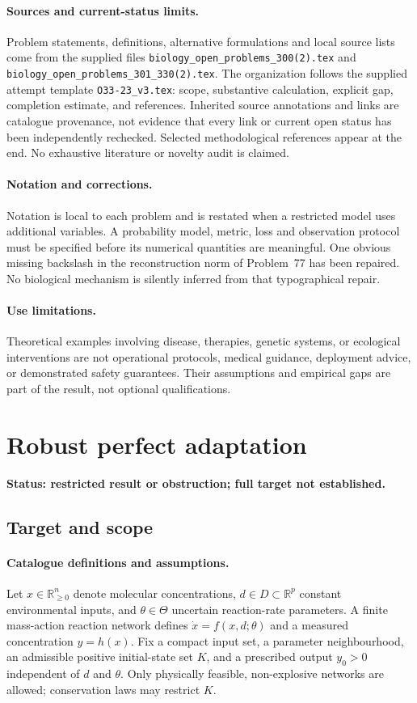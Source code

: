 \documentclass[11pt]{article}
\begin{document}
\paragraph{Sources and current-status limits.}
Problem statements, definitions, alternative formulations and local source lists
come from the supplied files
\texttt{biology\_open\_problems\_300(2).tex} and
\texttt{biology\_open\_problems\_301\_330(2).tex}.
The organization follows the supplied attempt template
\texttt{O33-23\_v3.tex}: scope, substantive calculation, explicit gap,
completion estimate, and references. Inherited source annotations and links are
catalogue provenance, not evidence that every link or current open status has
been independently rechecked. Selected methodological references appear at the
end. No exhaustive literature or novelty audit is claimed.

\paragraph{Notation and corrections.}
Notation is local to each problem and is restated when a restricted model uses
additional variables. A probability model, metric, loss and observation protocol
must be specified before its numerical quantities are meaningful. One obvious
missing backslash in the reconstruction norm of Problem~77 has been repaired.
No biological mechanism is silently inferred from that typographical repair.

\paragraph{Use limitations.}
Theoretical examples involving disease, therapies, genetic systems, or ecological
interventions are not operational protocols, medical guidance, deployment advice,
or demonstrated safety guarantees. Their assumptions and empirical gaps are part
of the result, not optional qualifications.


\section*{Robust perfect adaptation}
\label{prob:051}
\noindent\textbf{Status: restricted result or obstruction; full target not established.}
\subsection{Target and scope}
\paragraph{Catalogue definitions and assumptions.}
Let $x\in\mathbb{R}_{\ge0}^n$ denote molecular concentrations, $d\in D\subset\mathbb{R}^p$ constant environmental inputs, and $\theta\in\Theta$ uncertain reaction-rate parameters. A finite mass-action reaction network defines $\dot x=f(x,d;\theta)$ and a measured concentration $y=h(x)$. Fix a compact input set, a parameter neighbourhood, an admissible positive initial-state set $K$, and a prescribed output $y_0>0$ independent of $d$ and $\theta$. Only physically feasible, non-explosive networks are allowed; conservation laws may restrict $K$.
\end{document}
